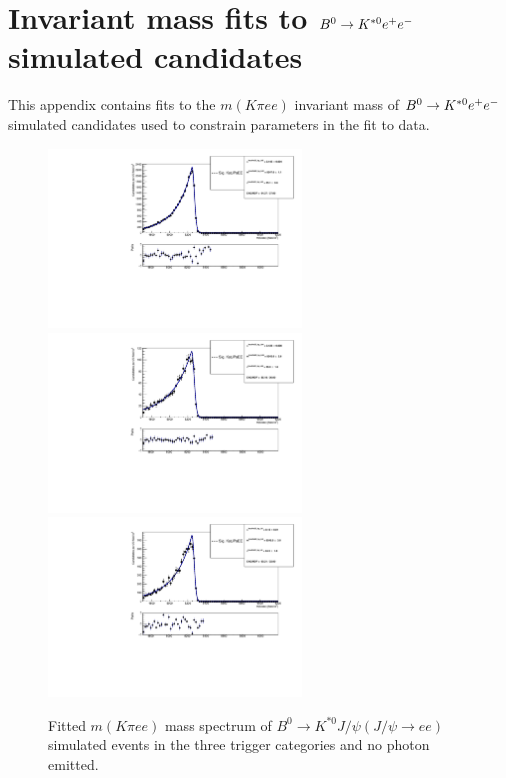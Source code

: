 \chapter{Invariant mass fits to $B^0\rightarrow K^{*0}e^+ e^-$ simulated candidates}
\label{app:RKMCfits}

This appendix contains fits to the $m(K\pi ee )$ invariant mass of $B^0\rightarrow K^{*0}e^+ e^-$ simulated candidates
used to constrain parameters in the fit to data.

\begin{figure}[h!]
\centering
\includegraphics[width=0.6\textwidth]{RKst/figs/fit_EEs_0_EE-q2central-gmc/KstJPsEE_0g_L0E_fitAndRes.pdf}
\includegraphics[width=0.6\textwidth]{RKst/figs/fit_EEs_0_EE-q2central-gmc/KstJPsEE_0g_L0H_fitAndRes.pdf}
\includegraphics[width=0.6\textwidth]{RKst/figs/fit_EEs_0_EE-q2central-gmc/KstJPsEE_0g_L0I_fitAndRes.pdf}
\caption{Fitted $m(K\pi ee)$ mass spectrum of $B^0 \rightarrow K^{*0} J/\psi(J/\psi\rightarrow ee)$ simulated
events in the three trigger categories and no photon emitted. }
\label{fig:FitEE_MC_inTrigCat_Brem0}
\end{figure}
